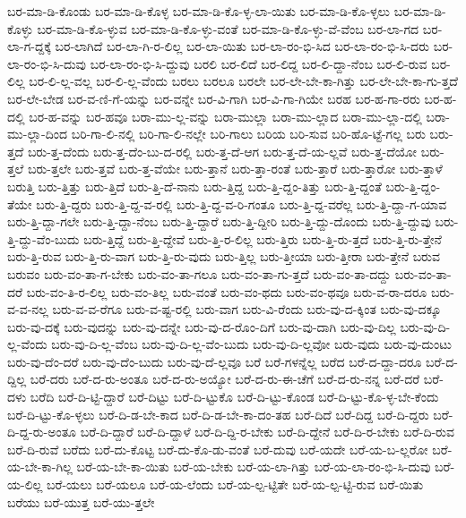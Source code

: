 {ಬರ-ಮಾ-ಡಿ-ಕೊಂಡು
ಬರ-ಮಾ-ಡಿ-ಕೊಳ್ಳ
ಬರ-ಮಾ-ಡಿ-ಕೊ-ಳ್ಳ-ಲಾ-ಯಿತು
ಬರ-ಮಾ-ಡಿ-ಕೊ-ಳ್ಳಲು
ಬರ-ಮಾ-ಡಿ-ಕೊಳ್ಳು
ಬರ-ಮಾ-ಡಿ-ಕೊ-ಳ್ಳುವ
ಬರ-ಮಾ-ಡಿ-ಕೊ-ಳ್ಳು-ವಂತೆ
ಬರ-ಮಾ-ಡಿ-ಕೊ-ಳ್ಳು-ವೆ-ವೆಂಬ
ಬರ-ಲಾ-ಗದ
ಬರ-ಲಾ-ಗ-ದ್ದಕ್ಕೆ
ಬರ-ಲಾಗಿದೆ
ಬರ-ಲಾ-ಗಿ-ರ-ಲಿಲ್ಲ
ಬರ-ಲಾ-ಯಿತು
ಬರ-ಲಾ-ರಂ-ಭಿ-ಸಿದ
ಬರ-ಲಾ-ರಂ-ಭಿ-ಸಿ-ದರು
ಬರ-ಲಾ-ರಂ-ಭಿ-ಸಿ-ದುವು
ಬರ-ಲಾ-ರಂ-ಭಿ-ಸಿ-ದ್ದುವು
ಬರಲಿ
ಬರ-ಲಿದೆ
ಬರ-ಲಿದ್ದ
ಬರ-ಲಿ-ದ್ದಾ-ನೆಂಬ
ಬರ-ಲಿ-ರುವ
ಬರ-ಲಿಲ್ಲ
ಬರ-ಲಿ-ಲ್ಲ-ವಲ್ಲ
ಬರ-ಲಿ-ಲ್ಲ-ವೆಂದು
ಬರಲು
ಬರಲೂ
ಬರಲೇ
ಬರ-ಲೇ-ಬೇ-ಕಾ-ಗಿತ್ತು
ಬರ-ಲೇ-ಬೇ-ಕಾ-ಗು-ತ್ತದೆ
ಬರ-ಲೇ-ಬೇಡ
ಬರ-ವ-ಣಿ-ಗೆ-ಯನ್ನು
ಬರ-ವನ್ನೇ
ಬರ-ವಿ-ಗಾಗಿ
ಬರ-ವಿ-ಗಾ-ಗಿಯೇ
ಬರಹ
ಬರ-ಹ-ಗಾ-ರರು
ಬರ-ಹ-ದಲ್ಲಿ
ಬರ-ಹ-ವನ್ನು
ಬರ-ಹವೂ
ಬರಾ-ಮು-ಲ್ಲ-ವನ್ನು
ಬರಾ-ಮುಲ್ಲಾ
ಬರಾ-ಮು-ಲ್ಲಾದ
ಬರಾ-ಮು-ಲ್ಲಾ-ದಲ್ಲಿ
ಬರಾ-ಮು-ಲ್ಲಾ-ದಿಂದ
ಬರಿ-ಗಾ-ಲಿ-ನಲ್ಲಿ
ಬರಿ-ಗಾ-ಲಿ-ನಲ್ಲೇ
ಬರಿ-ಗಾಲು
ಬರಿಯ
ಬರಿ-ಸುವ
ಬರಿ-ಹೊ-ಟ್ಟೆ-ಗಲ್ಲ
ಬರು
ಬರು-ತ್ತದೆ
ಬರು-ತ್ತ-ದೆಂದು
ಬರು-ತ್ತ-ದೆಂ-ಬು-ದ-ರಲ್ಲಿ
ಬರು-ತ್ತ-ದೆ-ಆಗ
ಬರು-ತ್ತ-ದೆ-ಯ-ಲ್ಲವೆ
ಬರು-ತ್ತ-ದೆಯೋ
ಬರು-ತ್ತಲೆ
ಬರು-ತ್ತಲೇ
ಬರು-ತ್ತವೆ
ಬರು-ತ್ತ-ವೆಯೇ
ಬರು-ತ್ತಾನೆ
ಬರು-ತ್ತಾ-ರಂತೆ
ಬರು-ತ್ತಾರೆ
ಬರು-ತ್ತಾರೋ
ಬರು-ತ್ತಾಳೆ
ಬರುತ್ತಿ
ಬರು-ತ್ತಿತ್ತು
ಬರು-ತ್ತಿದೆ
ಬರು-ತ್ತಿ-ದೆ-ನಾನು
ಬರು-ತ್ತಿದ್ದ
ಬರು-ತ್ತಿ-ದ್ದಂ-ತಿತ್ತು
ಬರು-ತ್ತಿ-ದ್ದಂತೆ
ಬರು-ತ್ತಿ-ದ್ದಂ-ತೆಯೇ
ಬರು-ತ್ತಿ-ದ್ದರು
ಬರು-ತ್ತಿ-ದ್ದ-ವ-ರಲ್ಲಿ
ಬರು-ತ್ತಿ-ದ್ದ-ವ-ರಿ-ಗಂತೂ
ಬರು-ತ್ತಿ-ದ್ದ-ವರೆಲ್ಲ
ಬರು-ತ್ತಿ-ದ್ದಾ-ಗ-ಯಾವ
ಬರು-ತ್ತಿ-ದ್ದಾ-ಗಲೇ
ಬರು-ತ್ತಿ-ದ್ದಾ-ನೆಂಬ
ಬರು-ತ್ತಿ-ದ್ದಾರೆ
ಬರು-ತ್ತಿ-ದ್ದೀರಿ
ಬರು-ತ್ತಿ-ದ್ದು-ದೊಂದು
ಬರು-ತ್ತಿ-ದ್ದುವು
ಬರು-ತ್ತಿ-ದ್ದು-ವೆಂ-ಬುದು
ಬರು-ತ್ತಿದ್ದೆ
ಬರು-ತ್ತಿ-ದ್ದೇವೆ
ಬರು-ತ್ತಿ-ರ-ಲಿಲ್ಲ
ಬರು-ತ್ತಿರು
ಬರು-ತ್ತಿ-ರು-ತ್ತದೆ
ಬರು-ತ್ತಿ-ರು-ತ್ತೇನೆ
ಬರು-ತ್ತಿ-ರುವ
ಬರು-ತ್ತಿ-ರು-ವಾಗ
ಬರು-ತ್ತಿ-ರು-ವುದು
ಬರು-ತ್ತಿಲ್ಲ
ಬರು-ತ್ತೀಯಾ
ಬರು-ತ್ತೀರಾ
ಬರು-ತ್ತೇನೆ
ಬರುವ
ಬರುವಂ
ಬರು-ವಂ-ತಾ-ಗ-ಬೇಕು
ಬರು-ವಂ-ತಾ-ಗಲೂ
ಬರು-ವಂ-ತಾ-ಗು-ತ್ತದೆ
ಬರು-ವಂ-ತಾ-ದದ್ದು
ಬರು-ವಂ-ತಾ-ದರೆ
ಬರು-ವಂ-ತಿ-ರ-ಲಿಲ್ಲ
ಬರು-ವಂ-ತಿಲ್ಲ
ಬರು-ವಂತೆ
ಬರು-ವಂ-ಥದು
ಬರು-ವಂ-ಥವೂ
ಬರು-ವ-ರಾ-ದರೂ
ಬರು-ವ-ವ-ನಲ್ಲ
ಬರು-ವ-ವ-ರೆಗೂ
ಬರು-ವ-ಷ್ಟ-ರಲ್ಲಿ
ಬರು-ವಾಗ
ಬರು-ವಿ-ರೆಂದು
ಬರು-ವು-ದ-ಕ್ಕಿಂತ
ಬರು-ವು-ದಕ್ಕೂ
ಬರು-ವು-ದಕ್ಕೆ
ಬರು-ವುದನ್ನು
ಬರು-ವು-ದನ್ನೇ
ಬರು-ವು-ದ-ರೊಂ-ದಿಗೆ
ಬರು-ವು-ದಾಗಿ
ಬರು-ವು-ದಿಲ್ಲ
ಬರು-ವು-ದಿ-ಲ್ಲ-ವೆಂದು
ಬರು-ವು-ದಿ-ಲ್ಲ-ವೆಂಬ
ಬರು-ವು-ದಿ-ಲ್ಲ-ವೆಂ-ಬುದು
ಬರು-ವು-ದಿ-ಲ್ಲವೋ
ಬರು-ವುದು
ಬರು-ವು-ದುಂಟು
ಬರು-ವು-ದೆಂ-ದರೆ
ಬರು-ವು-ದೆಂ-ಬುದು
ಬರು-ವು-ದೆ-ಲ್ಲವೂ
ಬರೆ
ಬರೆ-ಗಳನ್ನೆಲ್ಲ
ಬರೆದ
ಬರೆ-ದ-ದ್ದಾ-ದರೂ
ಬರೆ-ದ-ದ್ದಿಲ್ಲ
ಬರೆ-ದರು
ಬರೆ-ದ-ರು-ಅಂತೂ
ಬರೆ-ದ-ರು-ಅಯ್ಯೋ
ಬರೆ-ದ-ರು-ಈ-ಚೆಗೆ
ಬರೆ-ದ-ರು-ನನ್ನ
ಬರೆ-ದರೆ
ಬರೆ-ದಳು
ಬರೆದಿ
ಬರೆ-ದಿ-ಟ್ಟಿ-ದ್ದಾರೆ
ಬರೆ-ದಿಟ್ಟು
ಬರೆ-ದಿ-ಟ್ಟುಕೊ
ಬರೆ-ದಿ-ಟ್ಟು-ಕೊಂಡ
ಬರೆ-ದಿ-ಟ್ಟು-ಕೊ-ಳ್ಳ-ಬೇ-ಕೆಂದು
ಬರೆ-ದಿ-ಟ್ಟು-ಕೊ-ಳ್ಳಲು
ಬರೆ-ದಿ-ಡ-ಬೇ-ಕಾದ
ಬರೆ-ದಿ-ಡ-ಬೇ-ಕಾ-ದಂ-ತಹ
ಬರೆ-ದಿದೆ
ಬರೆ-ದಿದ್ದ
ಬರೆ-ದಿ-ದ್ದರು
ಬರೆ-ದಿ-ದ್ದ-ರು-ಅಂತೂ
ಬರೆ-ದಿ-ದ್ದಾರೆ
ಬರೆ-ದಿ-ದ್ದಾಳೆ
ಬರೆ-ದಿ-ದ್ದಿ-ರ-ಬೇಕು
ಬರೆ-ದಿ-ದ್ದೇನೆ
ಬರೆ-ದಿ-ರ-ಬೇಕು
ಬರೆ-ದಿ-ರುವ
ಬರೆ-ದಿ-ರುವೆ
ಬರೆದು
ಬರೆ-ದು-ಕೊಟ್ಟ
ಬರೆ-ದು-ಕೊ-ಡು-ವಂತೆ
ಬರೆ-ದುವು
ಬರೆ-ಯದೇ
ಬರೆ-ಯ-ಬ-ಲ್ಲರೋ
ಬರೆ-ಯ-ಬೇ-ಕಾ-ಗಿಲ್ಲ
ಬರೆ-ಯ-ಬೇ-ಕಾ-ಯಿತು
ಬರೆ-ಯ-ಬೇಕು
ಬರೆ-ಯ-ಲಾ-ಗಿತ್ತು
ಬರೆ-ಯ-ಲಾ-ರಂ-ಭಿ-ಸಿ-ದುವು
ಬರೆ-ಯ-ಲಿಲ್ಲ
ಬರೆ-ಯಲು
ಬರೆ-ಯಲೂ
ಬರೆ-ಯ-ಲೆಂದು
ಬರೆ-ಯ-ಲ್ಪ-ಟ್ಟಿತೇ
ಬರೆ-ಯ-ಲ್ಪ-ಟ್ಟಿ-ರುವ
ಬರೆ-ಯಿತು
ಬರೆಯು
ಬರೆ-ಯುತ್ತ
ಬರೆ-ಯು-ತ್ತಲೇ
}
